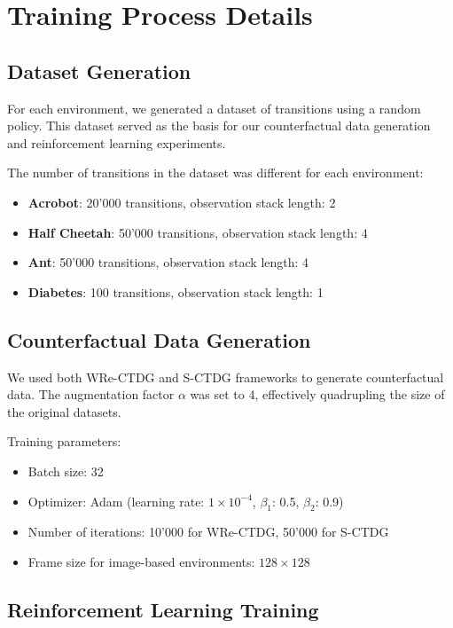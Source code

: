 \section{Training Process Details}

\subsection{Dataset Generation}

For each environment, we generated a dataset of transitions using a random policy.
This dataset served as the basis for our counterfactual
data generation and reinforcement learning experiments.

The number of transitions in the dataset was different for each environment:
\begin{itemize}
    \item \textbf{Acrobot}: 20'000 transitions, observation stack length: 2
    \item \textbf{Half Cheetah}: 50'000 transitions, observation stack length: 4
    \item \textbf{Ant}: 50'000 transitions, observation stack length: 4
    \item \textbf{Diabetes}: 100 transitions, observation stack length: 1
\end{itemize}

\subsection{Counterfactual Data Generation}

We used both WRe-CTDG and S-CTDG frameworks to generate counterfactual data.
The augmentation factor $\alpha$ was set to 4, effectively quadrupling
the size of the original datasets.

Training parameters:
\begin{itemize}
    \item Batch size: 32
    \item Optimizer: Adam (learning rate: $1\times 10^{-4}$, $\beta_1$: 0.5, $\beta_2$: 0.9)
    \item Number of iterations: 10'000 for WRe-CTDG, 50'000 for S-CTDG
    \item Frame size for image-based environments: $128\times 128$
\end{itemize}



\subsection{Reinforcement Learning Training}

